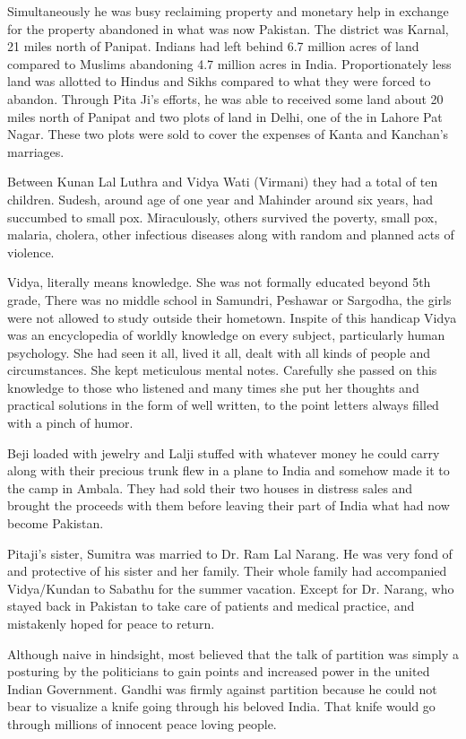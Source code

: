 Simultaneously he was busy reclaiming property and monetary help in exchange for the property abandoned in what was now Pakistan. The district was Karnal, 21 miles north of Panipat. Indians had left behind 6.7 million acres of land compared to Muslims abandoning 4.7 million acres in India. Proportionately less land was allotted to Hindus and Sikhs compared to what they were forced to abandon. Through Pita Ji’s efforts, he was able to received some land about 20 miles north of Panipat and two plots of land in Delhi, one of the in Lahore Pat Nagar. These two plots were sold to cover the expenses of Kanta and Kanchan’s marriages. 


Between Kunan Lal Luthra and Vidya Wati (Virmani) they had a total of ten children. Sudesh, around age of one year and Mahinder around six years, had succumbed to small pox. Miraculously, others survived the poverty, small pox, malaria, cholera, other  infectious diseases along with random and planned acts of violence.

Vidya, literally means knowledge. She was not formally educated beyond 5th grade, There was no middle school in Samundri, Peshawar or Sargodha, the girls were not allowed to study outside their hometown. Inspite of this handicap Vidya was an encyclopedia of worldly knowledge on every subject, particularly human psychology. She had seen it all, lived it all, dealt with all kinds of people and circumstances. She kept meticulous mental notes. Carefully she passed on this knowledge to those who listened and many times she put her thoughts and practical solutions in the form of well written, to the point letters always filled with a pinch of humor.

Beji loaded with jewelry  and Lalji stuffed with whatever money he could carry along with their precious  trunk flew in a plane to India and somehow made it to the camp in Ambala. They had sold their two houses in distress sales and brought the proceeds with them before leaving their part of India what had now become Pakistan. 

Pitaji's sister, Sumitra was married to Dr. Ram Lal Narang. He was very fond of and protective of his sister and her family. Their whole family had accompanied Vidya/Kundan to Sabathu for the summer vacation. Except for Dr. Narang, who stayed back in Pakistan to take care of patients and medical practice, and mistakenly hoped for peace to return. 

Although naive in hindsight, most believed that the talk of partition was simply a posturing by the politicians to gain points and increased power in the united Indian Government. Gandhi was firmly against partition because he could not bear to visualize a knife going through his beloved India. That knife would go through millions of innocent peace loving people. 

